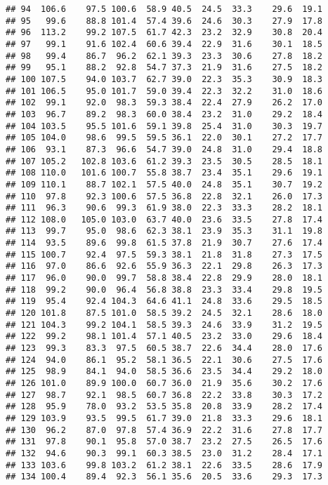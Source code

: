 \documentclass[
]{book}
\theoremstyle{definition}
\theoremstyle{definition}
\theoremstyle{definition}
\theoremstyle{definition}
\theoremstyle{remark}
\begin{document}
\begin{verbatim}
## 94  106.6    97.5 100.6  58.9 40.5  24.5  33.3    29.6  19.1
## 95   99.6    88.8 101.4  57.4 39.6  24.6  30.3    27.9  17.8
## 96  113.2    99.2 107.5  61.7 42.3  23.2  32.9    30.8  20.4
## 97   99.1    91.6 102.4  60.6 39.4  22.9  31.6    30.1  18.5
## 98   99.4    86.7  96.2  62.1 39.3  23.3  30.6    27.8  18.2
## 99   95.1    88.2  92.8  54.7 37.3  21.9  31.6    27.5  18.2
## 100 107.5    94.0 103.7  62.7 39.0  22.3  35.3    30.9  18.3
## 101 106.5    95.0 101.7  59.0 39.4  22.3  32.2    31.0  18.6
## 102  99.1    92.0  98.3  59.3 38.4  22.4  27.9    26.2  17.0
## 103  96.7    89.2  98.3  60.0 38.4  23.2  31.0    29.2  18.4
## 104 103.5    95.5 101.6  59.1 39.8  25.4  31.0    30.3  19.7
## 105 104.0    98.6  99.5  59.5 36.1  22.0  30.1    27.2  17.7
## 106  93.1    87.3  96.6  54.7 39.0  24.8  31.0    29.4  18.8
## 107 105.2   102.8 103.6  61.2 39.3  23.5  30.5    28.5  18.1
## 108 110.0   101.6 100.7  55.8 38.7  23.4  35.1    29.6  19.1
## 109 110.1    88.7 102.1  57.5 40.0  24.8  35.1    30.7  19.2
## 110  97.8    92.3 100.6  57.5 36.8  22.8  32.1    26.0  17.3
## 111  96.3    90.6  99.3  61.9 38.0  22.3  33.3    28.2  18.1
## 112 108.0   105.0 103.0  63.7 40.0  23.6  33.5    27.8  17.4
## 113  99.7    95.0  98.6  62.3 38.1  23.9  35.3    31.1  19.8
## 114  93.5    89.6  99.8  61.5 37.8  21.9  30.7    27.6  17.4
## 115 100.7    92.4  97.5  59.3 38.1  21.8  31.8    27.3  17.5
## 116  97.0    86.6  92.6  55.9 36.3  22.1  29.8    26.3  17.3
## 117  96.0    90.0  99.7  58.8 38.4  22.8  29.9    28.0  18.1
## 118  99.2    90.0  96.4  56.8 38.8  23.3  33.4    29.8  19.5
## 119  95.4    92.4 104.3  64.6 41.1  24.8  33.6    29.5  18.5
## 120 101.8    87.5 101.0  58.5 39.2  24.5  32.1    28.6  18.0
## 121 104.3    99.2 104.1  58.5 39.3  24.6  33.9    31.2  19.5
## 122  99.2    98.1 101.4  57.1 40.5  23.2  33.0    29.6  18.4
## 123  99.3    83.3  97.5  60.5 38.7  22.6  34.4    28.0  17.6
## 124  94.0    86.1  95.2  58.1 36.5  22.1  30.6    27.5  17.6
## 125  98.9    84.1  94.0  58.5 36.6  23.5  34.4    29.2  18.0
## 126 101.0    89.9 100.0  60.7 36.0  21.9  35.6    30.2  17.6
## 127  98.7    92.1  98.5  60.7 36.8  22.2  33.8    30.3  17.2
## 128  95.9    78.0  93.2  53.5 35.8  20.8  33.9    28.2  17.4
## 129 103.9    93.5  99.5  61.7 39.0  21.8  33.3    29.6  18.1
## 130  96.2    87.0  97.8  57.4 36.9  22.2  31.6    27.8  17.7
## 131  97.8    90.1  95.8  57.0 38.7  23.2  27.5    26.5  17.6
## 132  94.6    90.3  99.1  60.3 38.5  23.0  31.2    28.4  17.1
## 133 103.6    99.8 103.2  61.2 38.1  22.6  33.5    28.6  17.9
## 134 100.4    89.4  92.3  56.1 35.6  20.5  33.6    29.3  17.3

\end{verbatim}
\end{document}
